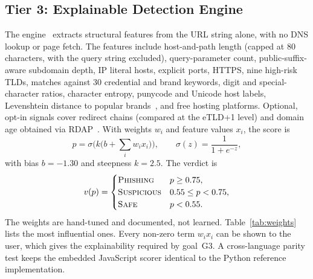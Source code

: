 \documentclass[conference]{IEEEtran}
\begin{document}
\subsection{Tier 3: Explainable Detection Engine}
\label{sec:engine}
The engine~\cite{phishguardai} extracts structural features from the URL
string alone, with no DNS lookup or page fetch. The features include
host-and-path length (capped at 80 characters, with the query string
excluded), query-parameter count, public-suffix-aware subdomain depth, IP
literal hosts, explicit ports, HTTPS, nine high-risk TLDs, matches against 30
credential and brand keywords, digit and special-character ratios,
character entropy, punycode and Unicode host labels, Levenshtein distance to
popular brands~\cite{levenshtein1966}, and free hosting platforms. Optional,
opt-in signals cover redirect chains (compared at the eTLD+1 level) and
domain age obtained via RDAP~\cite{rfc9083}. With weights $w_i$ and feature
values $x_i$, the score is
\begin{equation}
  p = \sigma\!\Big(k\big(b + \textstyle\sum_i w_i x_i\big)\Big),
  \qquad \sigma(z)=\frac{1}{1+e^{-z}},
  \label{eq:score}
\end{equation}
with bias $b=-1.30$ and steepness $k=2.5$. The verdict is
\begin{equation}
  v(p)=
  \begin{cases}
    \textsc{Phishing}   & p \ge 0.75,\\
    \textsc{Suspicious} & 0.55 \le p < 0.75,\\
    \textsc{Safe}       & p < 0.55.
  \end{cases}
  \label{eq:verdict}
\end{equation}
The weights are hand-tuned and documented, not learned. Table~\ref{tab:weights}
lists the most influential ones. Every non-zero term $w_i x_i$ can be shown
to the user, which gives the explainability required by goal~G3. A
cross-language parity test keeps the embedded JavaScript scorer identical to
the Python reference implementation.
\end{document}
